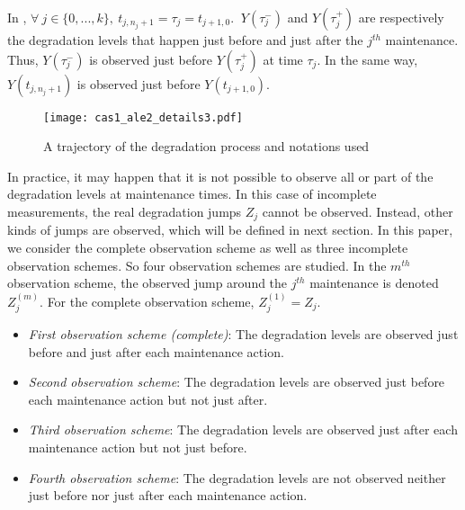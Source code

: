 In , $\forall\ j \in \{0,...,k\}, \ t_{j,n_j+1}=\tau_j=t_{j+1,0}$. $\ Y(\tau_j^-)$  and $Y(\tau_j^+)$ are respectively the degradation levels that happen just before and just after the $j^{th}$ maintenance. Thus,  $Y(\tau_j^-)$ is observed just before $Y(\tau_j^+)$ at time $\tau_j$. In the same way, $Y(t_{j,n_j+1})$ is observed just before $Y(t_{j+1,0})$.

\begin{figure}[htbp]
\centering
\texttt{[image: cas1\_ale2\_details3.pdf]} 
\caption{A trajectory of the degradation process and notations used}
\label{figure:fig_intro}
\end{figure}

In practice, it may happen that it is not possible to observe all or part of the degradation levels at maintenance times. In this case of incomplete measurements, the real degradation jumps $Z_j$ cannot be observed. Instead, other kinds of jumps are observed, which will be defined in next section. In this paper, we consider the complete observation scheme as well as three incomplete observation schemes. So four observation schemes are studied. In the $m^{th}$ observation scheme, the observed jump around the $j^{th}$ maintenance is denoted $Z_j^{(m)}$. For the complete observation scheme, $Z_j^{(1)}=Z_j$.


\begin{itemize}

\item {\it First observation scheme (complete)}: The degradation levels are observed just before and just after each maintenance action. 

\item {\it Second observation scheme}: The degradation levels are observed just before each maintenance action but not just after.

\item {\it Third observation scheme}: The degradation levels are observed just after each maintenance action but not just before.

\item {\it Fourth observation scheme}: The degradation levels are not observed neither just before nor just after each maintenance action. 
\end{itemize}

